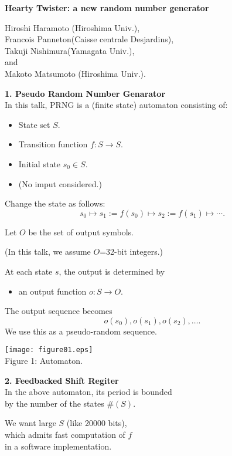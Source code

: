 \documentclass[a4j,12pt,landscape]{jarticle}
\title{}
\author{}
\date{\today}
\begin{document}
{\Huge

\vspace*{2cm}
\begin{center}
{\bf Hearty Twister: a new random number generator}
\vspace{1cm}

Hiroshi Haramoto (Hiroshima Univ.), \\
Francois Panneton(Caisse centrale Desjardins), \\
Takuji Nishimura(Yamagata Univ.), \\
and \\
Makoto Matsumoto (Hiroshima Univ.).
\end{center}
\newpage

\newpage
\noindent
{\bf 1. Pseudo Random Number Genarator}\\

In this talk, PRNG is a (finite state) automaton consisting of:
\begin{itemize}
\item State set $S$. 
\item Transition function $f:S \to S$.
\item Initial state $s_0 \in S$.
\item (No imput considered.)
\end{itemize}
Change the state as follows:
$$
s_0 \mapsto s_1:= f(s_0) \mapsto s_2:=f(s_1) \mapsto \cdots.
$$

\newpage
Let $O$ be the set of output symbols.

(In this talk, we assume $O$=32-bit integers.)

\vskip 1cm
At each state $s$, 
the output is determined by 
\begin{itemize}
\item an output function $o:S \to O$.
\end{itemize}
The output sequence becomes
$$
o(s_0),o(s_1),o(s_2),\ldots.
$$
We use this as a pseudo-random sequence.
\newpage
\begin{center}
\texttt{[image: figure01.eps]}
\\
Figure 1: Automaton.
\end{center}

 
\newpage
\noindent
{\bf 2. Feedbacked Shift Regiter}\\
In the above automaton, 
its period is bounded  \\
by the number of the states $\#(S)$.

\vskip 5mm
We want large $S$ (like 20000 bits), \\
which admits fast computation of $f$ \\
in a software implementation.

}
\end{document}
